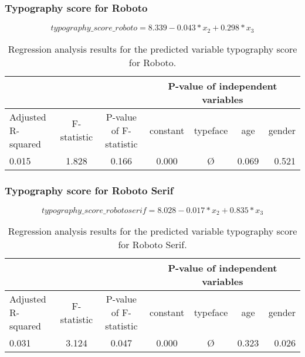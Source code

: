 \documentclass{article}
\begin{document}
\subsubsection*{Typography score for Roboto}
\begin{equation}
typography\_score\_roboto = 8.339 - 0.043 * x_2 + 0.298 * x_3
\label{eq:typographyscorerobotoreg}
\end{equation}
\begin{table}[H]
\centering
\begin{tabular}{ l|c|c|c|c|c|r } 
     \multicolumn{3}{c}{} &
     \multicolumn{4}{c}{\textbf{P-value of independent variables}} \\
    \hline
     Adjusted R-squared & F-statistic & P-value of F-statistic & constant & typeface & age & gender \\
     0.015 & 1.828 & 0.166 & 0.000 & \O & 0.069 & 0.521\\
\end{tabular}
\caption{\label{tab:typographyscorerobotoreg}Regression analysis results for the predicted variable typography score for Roboto.}
\end{table}

\subsubsection*{Typography score for Roboto Serif}
\begin{equation}
typography\_score\_robotoserif = 8.028 - 0.017 * x_2 + 0.835 * x_3
\label{eq:typographyscorerobotoserifregression}
\end{equation}
\begin{table}[H]
\centering
\begin{tabular}{ l|c|c|c|c|c|r }  
     \multicolumn{3}{c}{} &
     \multicolumn{4}{c}{\textbf{P-value of independent variables}} \\
    \hline
     Adjusted R-squared & F-statistic & P-value of F-statistic & constant & typeface & age & gender \\
     0.031 & 3.124 & 0.047 & 0.000 & \O & 0.323 & 0.026 \\
\end{tabular}
\caption{\label{tab:typographyscorerobotoserifreg}Regression analysis results for the predicted variable typography score for Roboto Serif.}
\end{table}
\end{document}
